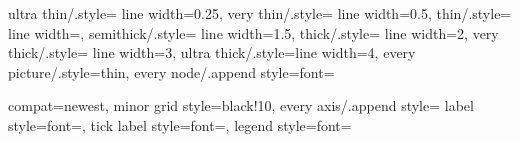 \newcommand{\plotscale}{1}

\newcommand{\plotratio}{0.618}

\newlength{\mylinewidth}
\setlength{\mylinewidth}{0.6pt}

\newcommand{\plotfontsize}{\footnotesize}

\tikzset
{
  ultra thin/.style= {line width=0.25\mylinewidth},
  very thin/.style=  {line width=0.5\mylinewidth},
  thin/.style=       {line width=\mylinewidth},
  semithick/.style=  {line width=1.5\mylinewidth},
  thick/.style=      {line width=2\mylinewidth},
  very thick/.style= {line width=3\mylinewidth},
  ultra thick/.style={line width=4\mylinewidth},
  every picture/.style={thin},
  every node/.append style={font=\plotfontsize}
}

\pgfplotsset
{
  compat=newest,
  minor grid style={black!10},
  every axis/.append style=
  {
    label style={font=\plotfontsize},
    tick label style={font=\plotfontsize},
    legend style={font=\plotfontsize}
  }
}

\newlength{\tikzthin}
\setlength{\tikzthin}{\mylinewidth}

\pgfplotsset{plot coordinates/math parser=false}
\newlength{\fwidth}
\newlength{\fheight}
\setlength{\fwidth}{\plotscale\linewidth}
\setlength{\fheight}{\plotratio\fwidth}

\let\OrgPgfTransformScale\pgftransformscale

